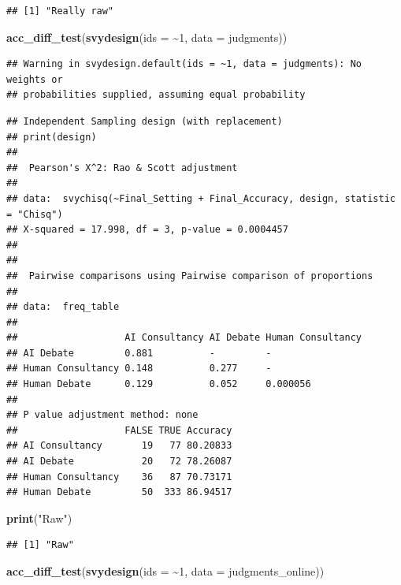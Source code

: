 \documentclass[
]{article}
\newenvironment{Shaded}{\begin{snugshade}}{\end{snugshade}}
\newcommand{\AttributeTok}[1]{\textcolor[rgb]{0.13,0.29,0.53}{#1}}
\newcommand{\DecValTok}[1]{\textcolor[rgb]{0.00,0.00,0.81}{#1}}
\newcommand{\FunctionTok}[1]{\textcolor[rgb]{0.13,0.29,0.53}{\textbf{#1}}}
\newcommand{\NormalTok}[1]{#1}
\newcommand{\SpecialCharTok}[1]{\textcolor[rgb]{0.81,0.36,0.00}{\textbf{#1}}}
\newcommand{\StringTok}[1]{\textcolor[rgb]{0.31,0.60,0.02}{#1}}
\begin{document}
\begin{verbatim}
## [1] "Really raw"
\end{verbatim}

\begin{Shaded}
\begin{Highlighting}[]
\FunctionTok{acc\_diff\_test}\NormalTok{(}\FunctionTok{svydesign}\NormalTok{(}\AttributeTok{ids =} \SpecialCharTok{\textasciitilde{}}\DecValTok{1}\NormalTok{, }\AttributeTok{data =}\NormalTok{ judgments))}
\end{Highlighting}
\end{Shaded}

\begin{verbatim}
## Warning in svydesign.default(ids = ~1, data = judgments): No weights or
## probabilities supplied, assuming equal probability
\end{verbatim}

\begin{verbatim}
## Independent Sampling design (with replacement)
## print(design)
## 
##  Pearson's X^2: Rao & Scott adjustment
## 
## data:  svychisq(~Final_Setting + Final_Accuracy, design, statistic = "Chisq")
## X-squared = 17.998, df = 3, p-value = 0.0004457
## 
## 
##  Pairwise comparisons using Pairwise comparison of proportions 
## 
## data:  freq_table 
## 
##                   AI Consultancy AI Debate Human Consultancy
## AI Debate         0.881          -         -                
## Human Consultancy 0.148          0.277     -                
## Human Debate      0.129          0.052     0.000056         
## 
## P value adjustment method: none 
##                   FALSE TRUE Accuracy
## AI Consultancy       19   77 80.20833
## AI Debate            20   72 78.26087
## Human Consultancy    36   87 70.73171
## Human Debate         50  333 86.94517
\end{verbatim}

\begin{Shaded}
\begin{Highlighting}[]
\FunctionTok{print}\NormalTok{(}\StringTok{"Raw"}\NormalTok{)}
\end{Highlighting}
\end{Shaded}

\begin{verbatim}
## [1] "Raw"
\end{verbatim}

\begin{Shaded}
\begin{Highlighting}[]
\FunctionTok{acc\_diff\_test}\NormalTok{(}\FunctionTok{svydesign}\NormalTok{(}\AttributeTok{ids =} \SpecialCharTok{\textasciitilde{}}\DecValTok{1}\NormalTok{, }\AttributeTok{data =}\NormalTok{ judgments\_online))}
\end{Highlighting}
\end{Shaded}
\end{document}
